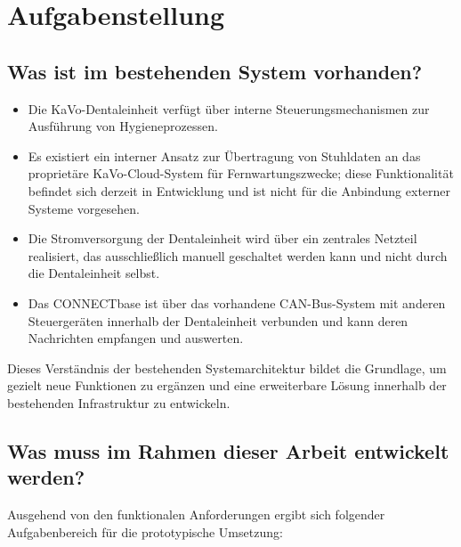 \section{Aufgabenstellung}

\subsection*{Was ist im bestehenden System vorhanden?}

\begin{itemize}
  \item Die KaVo-Dentaleinheit verfügt über interne Steuerungsmechanismen zur Ausführung von Hygieneprozessen.\\
  \item Es existiert ein interner Ansatz zur Übertragung von Stuhldaten an das proprietäre KaVo-Cloud-System für Fernwartungszwecke; diese Funktionalität befindet sich derzeit in Entwicklung und ist nicht für die Anbindung externer Systeme vorgesehen.\\
  \item Die Stromversorgung der Dentaleinheit wird über ein zentrales Netzteil realisiert, das ausschließlich manuell geschaltet werden kann und nicht durch die Dentaleinheit selbst.\\
  \item Das CONNECTbase ist über das vorhandene CAN-Bus-System mit anderen Steuergeräten innerhalb der Dentaleinheit verbunden und kann deren Nachrichten empfangen und auswerten.
\end{itemize}

Dieses Verständnis der bestehenden Systemarchitektur bildet die Grundlage, um gezielt neue Funktionen zu ergänzen und eine erweiterbare Lösung innerhalb der bestehenden Infrastruktur zu entwickeln.

\subsection*{Was muss im Rahmen dieser Arbeit entwickelt werden?}

Ausgehend von den funktionalen Anforderungen ergibt sich folgender Aufgabenbereich für die prototypische Umsetzung:

